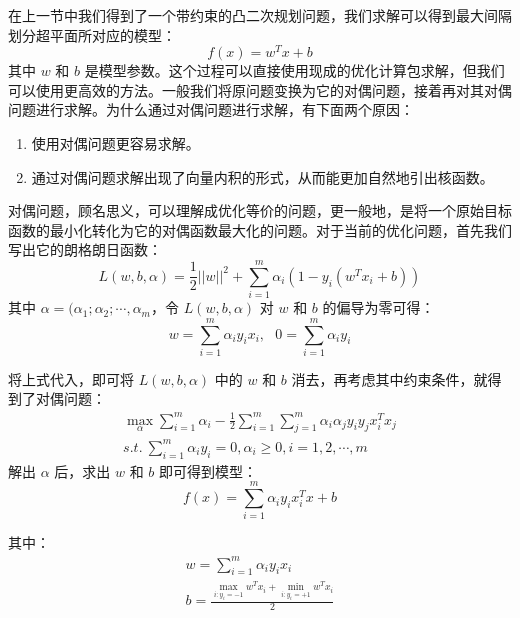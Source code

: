 \documentclass[12pt, a4paper]{article} %
\begin{document}
在上一节中我们得到了一个带约束的凸二次规划问题，我们求解可以得到最大间隔划分超平面所对应的模型：
\begin{equation*}
    f(x) = w^T x + b
\end{equation*}
其中 $w$ 和 $b$ 是模型参数。这个过程可以直接使用现成的优化计算包求解，但我们可以使用更高效的方法。一般我们将原问题变换为它的对偶问题，接着再对其对偶问题进行求解。为什么通过对偶问题进行求解，有下面两个原因：

\begin{enumerate}[\hspace*{2em} i.]
    \item 使用对偶问题更容易求解。
    \item 通过对偶问题求解出现了向量内积的形式，从而能更加自然地引出核函数。
\end{enumerate}

对偶问题，顾名思义，可以理解成优化等价的问题，更一般地，是将一个原始目标函数的最小化转化为它的对偶函数最大化的问题。对于当前的优化问题，首先我们写出它的朗格朗日函数：
\begin{equation*}
    L(w, b, \alpha) = \frac{1}{2} ||w||^2 + \sum_{i = 1}^{m} \alpha_i (1 - y_i(w^T x_i + b))
\end{equation*}
其中 $\alpha = (\alpha_1; \alpha_2; \cdots, \alpha_m$，令 $L(w, b, \alpha)$ 对 $w$ 和 $b$ 的偏导为零可得：
\begin{equation*}
    w = \sum_{i = 1}^{m} \alpha_i y_i x_i, \ \ \ 0 = \sum_{i = 1}^{m} \alpha_i y_i
\end{equation*}

将上式代入，即可将 $L(w, b, \alpha)$ 中的 $w$ 和 $b$ 消去，再考虑其中约束条件，就得到了对偶问题：
\begin{equation*}
    \begin{array}{*{20}{l}}
        \displaystyle \max_{\alpha} \sum_{i = 1}^{m} \alpha_i - \frac{1}{2} \sum_{i = 1}^{m} \sum_{j = 1}^{m} \alpha_i \alpha_j y_i y_j x_i ^T x_j\\
        \displaystyle s.t. \ \sum_{i = 1}^{m} \alpha_i y_i = 0, \alpha_i \ge 0, i = 1, 2, \cdots, m
    \end{array}
\end{equation*}
解出 $\alpha$ 后，求出 $w$ 和 $b$ 即可得到模型：
\begin{equation*}
    f(x) = \sum_{i = 1}^{m} \alpha_i y_i x_i^T x + b
\end{equation*}

其中：
\begin{equation*}
    \begin{array}{*{20}{l}}
        \displaystyle w = \sum_{i = 1}^{m} \alpha_i y_i x_i \\
        \displaystyle b = \frac{
            \displaystyle \max_{i: y_i = -1} w^T x_i + \min_{i: y_i = +1} w^T x_i
        }{2}
    \end{array}
\end{equation*}
\end{document}
